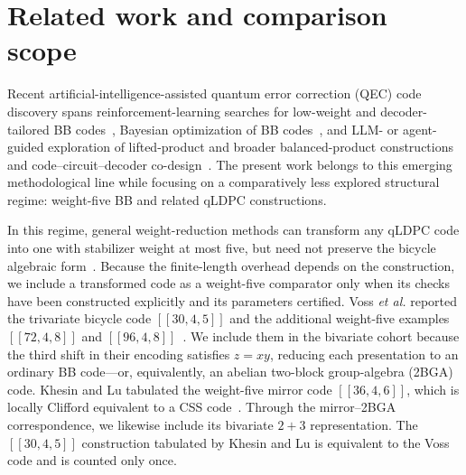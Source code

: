 \documentclass[aps,prx,twocolumn,superscriptaddress,nofootinbib,floatfix]{revtex4-2}
\newcommand{\code}[1]{\ensuremath{\left[\!\left[#1\right]\!\right]}}
\begin{document}
\section{Related work and comparison scope}

Recent artificial-intelligence-assisted quantum error correction (QEC) code
discovery spans reinforcement-learning searches for
low-weight and decoder-tailored BB codes~\cite{he2025lowweight,sella2026decoder},
Bayesian optimization of BB codes~\cite{chengyu2026bayesian}, and LLM- or
agent-guided exploration of lifted-product and broader balanced-product
constructions and code--circuit--decoder
co-design~\cite{liu2026structured,yan2026omniqec,qian2026multiagent}.  The
present work belongs to this emerging methodological line while focusing on a
comparatively less explored structural regime: weight-five BB and related
qLDPC constructions.

In this regime, general weight-reduction methods can transform any qLDPC code
into one with stabilizer weight at most five, but need not preserve the bicycle
algebraic form~\cite{hastings2021weight}.  Because the finite-length overhead
depends on the construction, we include a transformed code as a weight-five
comparator only when its checks have been constructed explicitly and its
parameters certified.  Voss \emph{et al.} reported the trivariate
bicycle code $\code{30,4,5}$ and the additional weight-five examples
$\code{72,4,8}$ and $\code{96,4,8}$~\cite{voss2025multivariate}.  We include
them in the bivariate cohort because the third shift in their encoding
satisfies $z=xy$, reducing each presentation to an ordinary BB code---or,
equivalently, an abelian two-block group-algebra (2BGA) code.  Khesin and Lu
tabulated the weight-five mirror code
$\code{36,4,6}$, which is locally
Clifford equivalent to a CSS code~\cite{khesin2026mirror}.  Through the
mirror--2BGA correspondence, we likewise include its bivariate $2+3$
representation.  The $\code{30,4,5}$ construction tabulated by Khesin and Lu
is equivalent to the Voss code and is counted only once.
\end{document}
